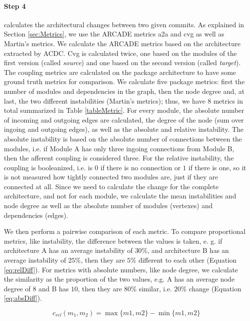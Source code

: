 \documentclass[sigplan, anonymous, review]{acmart}
\begin{document}
\paragraph{Step 4} calculates the architectural changes between two given commits.
As explained in Section \ref{sec:Metrics}, we use the ARCADE metrics a2a and cvg as well as Martin's metrics. We calculate the ARCADE metrics based on the architecture extracted by ACDC. Cvg is calculated twice, one based on the modules of the first version (called \textit{source}) and one based on the second version (called \textit{target}).
The coupling metrics are calculated on the package architecture to have some ground truth metrics for comparison. We calculate five package metrics: first the number of modules and dependencies in the graph, then the node degree and, at last, the two different instabilities (Martin's metrics); thus, we have 8 metrics in total summarized in Table \ref{tableMetric}.
For every module, the absolute number of incoming and outgoing edges are calculated, the degree of the node (sum over ingoing and outgoing edges), as well as the absolute and relative instability. The absolute instability is based on the absolute number of connections between the modules, i.e. if Module A has only three ingoing connections from Module B, then the afferent coupling is considered three. For the relative instability, the coupling is booleanized, i.e. is $0$ if there is no connection or $1$ if there is one, so it is not measured how tightly connected two modules are, just if they are connected at all.
Since we need to calculate the change for the complete architecture, and not for each module, we calculate the mean instabilities and node degree as well as the absolute number of modules (vertexes) and dependencies (edges).

We then perform a pairwise comparison of each metric. To compare proportional metrics, like instability, the difference between the values is taken, e. g. if architecture A has an average instability of $30\%$, and architecture B has an average instability of $25\%$, then they are $5\%$ different to each other (Equation \ref{eq:relDiff}). For metrics with absolute numbers, like node degree, we calculate the similarity as the proportion of the two values, e.g. A has an average node degree of $8$ and B has $10$, then they are $80\%$ similar, i.e. $20\%$ change (Equation \ref{eq:absDiff}).

\begin{equation} \label{eq:relDiff}
c_{rel}(m_1, m_2) =  \max\{m1, m2\} - \min\{m1, m2\}
\end{equation} 
\end{document}
